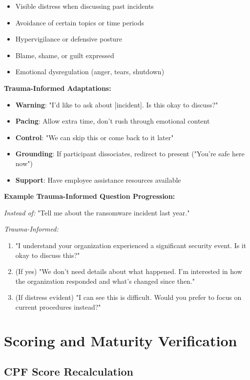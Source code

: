\documentclass[11pt,a4paper]{article}
\begin{document}
\begin{itemize}
\item Visible distress when discussing past incidents
\item Avoidance of certain topics or time periods
\item Hypervigilance or defensive posture
\item Blame, shame, or guilt expressed
\item Emotional dysregulation (anger, tears, shutdown)
\end{itemize}

\textbf{Trauma-Informed Adaptations:}

\begin{itemize}
\item \textbf{Warning}: "I'd like to ask about [incident]. Is this okay to discuss?"
\item \textbf{Pacing}: Allow extra time, don't rush through emotional content
\item \textbf{Control}: "We can skip this or come back to it later"
\item \textbf{Grounding}: If participant dissociates, redirect to present ("You're safe here now")
\item \textbf{Support}: Have employee assistance resources available
\end{itemize}

\textbf{Example Trauma-Informed Question Progression:}

\textit{Instead of:} "Tell me about the ransomware incident last year."

\textit{Trauma-Informed:}
\begin{enumerate}
\item "I understand your organization experienced a significant security event. Is it okay to discuss this?"
\item (If yes) "We don't need details about what happened. I'm interested in how the organization responded and what's changed since then."
\item (If distress evident) "I can see this is difficult. Would you prefer to focus on current procedures instead?"
\end{enumerate}

\section{Scoring and Maturity Verification}

\subsection{CPF Score Recalculation}
\end{document}
